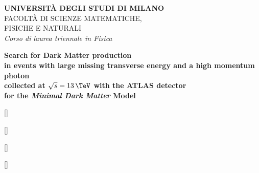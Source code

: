 \documentclass[a4paper,openright,11pt]{book}
\begin{document}
	
\begin{titlepage}
\begin{center}	
 	\textsc{\textbf{\Large UNIVERSIT\`A DEGLI STUDI DI MILANO}}\\
 	\textsc{\Large FACOLT\`A DI SCIENZE MATEMATICHE, \\FISICHE E NATURALI
}\\
 	\vspace{10pt}
 	\textit{\Large Corso di laurea triennale in Fisica}
 	\vspace{30ex}
 	
 	{\bfseries \large Search for Dark Matter production \\in events with large missing transverse energy and a high momentum photon \\collected at $\sqrt{s}=13 \,\TeV$ with the ATLAS detector \\for the {\itshape Minimal Dark Matter} Model}
\end{center}
\end{titlepage}
[\titlerule]
\frontmatter

\tableofcontents

\mainmatter
{}[\vspace{2ex}]
\titleformat{\section}[block]{\filcenter\large }{\thesection}{0pt}{\bfseries	\quad \large \centering}[\vspace{3pt}]
\titleformat{\subsection}[block]{\normalfont \large }{\thesubsection \quad}{0pt}{\itshape \bfseries}[]


%

\backmatter

\end{document}
